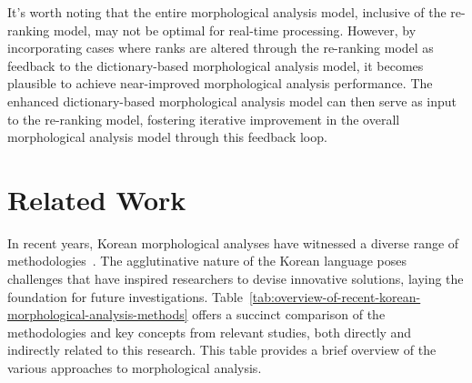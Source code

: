 \documentclass[AMS,STIX2COL]{WileyNJD-v2}
\begin{document}
    It's worth noting that the entire morphological analysis model, inclusive of the re-ranking model, may not be optimal for real-time processing.
    However, by incorporating cases where ranks are altered through the re-ranking model as feedback to the dictionary-based morphological analysis model, it becomes plausible to achieve near-improved morphological analysis performance.
    The enhanced dictionary-based morphological analysis model can then serve as input to the re-ranking model, fostering iterative improvement in the overall morphological analysis model through this feedback loop.


    \section{Related Work}\label{sec:related-work}

    In recent years, Korean morphological analyses have witnessed a diverse range of methodologies~\cite{KwonHC1991, LeeDG2009, ShimKS2011, LeeJS2011, ShinJC2012, LeeCK2013, NaSH2014, NaSH2015, HwangHS2016, KimHM2016, ChungES2016, LeeCH2016, Li2017, NaSH2018, KimSW2018, ChoiYS2018, MinJW2018, MinJW2019, KimHM2019, SongHJ2019, MinJW2020, SongHJ2020, ChoiYS2020, HwangHS2020, KimHJ2021, YounJY2021, MinJW2022, KimJM2022, ShinHJ2023}.
    The agglutinative nature of the Korean language poses challenges that have inspired researchers to devise innovative solutions, laying the foundation for future investigations.
    Table~\ref{tab:overview-of-recent-korean-morphological-analysis-methods} offers a succinct comparison of the methodologies and key concepts from relevant studies, both directly and indirectly related to this research.
    This table provides a brief overview of the various approaches to morphological analysis.
\end{document}
